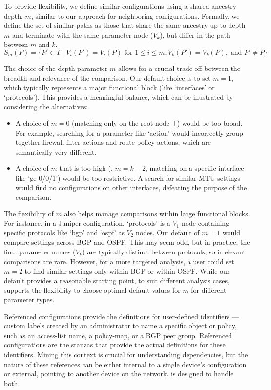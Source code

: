 To provide flexibility, we define similar configurations using a shared ancestry depth, $m$, similar to our approach for neighboring configurations. Formally, we define the set of similar paths as those that share the same ancestry up to depth $m$ and terminate with the same parameter node ($V_k$), but differ in the path between $m$ and $k$.
\[
S_m(P) = \{ P' \in T \mid V_i(P')=V_i(P) \text{ for } 1 \le i \le m, V_k(P')=V_k(P), \text{ and } P' \neq P \}
\]

The choice of the depth parameter $m$ allows for a crucial trade-off between the breadth and relevance of the comparison. Our default choice is to set $m=1$, which typically represents a major functional block (like `interfaces' or `protocols'). This provides a meaningful balance, which can be illustrated by considering the alternatives:
\begin{itemize}
    \item A choice of $m=0$ (matching only on the root node $\top$) would be too broad. For example, searching for a parameter like `action' would incorrectly group together firewall filter actions and route policy actions, which are semantically very different.
    \item A choice of $m$ that is too high (\eg, $m = k-2$, matching on a specific interface like `ge-0/0/1') would be too restrictive. A search for similar MTU settings would find no configurations on other interfaces, defeating the purpose of the comparison.
\end{itemize}

The flexibility of $m$ also helps manage comparisons within large functional blocks. For instance, in a Juniper configuration, `protocols' is a $V_1$ node containing specific protocols like `bgp' and `ospf' as $V_2$ nodes. Our default of $m=1$ would compare settings across BGP and OSPF. This may seem odd, but in practice, the final parameter names ($V_k$) are typically distinct between protocols, so irrelevant comparisons are rare. However, for a more targeted analysis, a user could set $m=2$ to find similar settings only within BGP or within OSPF. While our default provides a reasonable starting point, to suit different analysis cases, \sysname{} supports the flexibility to choose optimal default values for $m$ for different parameter types.



Referenced configurations provide the definitions for user-defined identifiers --- custom labels created by an administrator to name a specific object or policy, such as an access-list name, a policy-map, or a BGP peer group. Referenced configurations are the stanzas that provide the actual definitions for these identifiers. Mining this context is crucial for understanding dependencies, but the nature of these references can be either internal to a single device's configuration or external, pointing to another device on the network. \sysname{} is designed to handle both.

